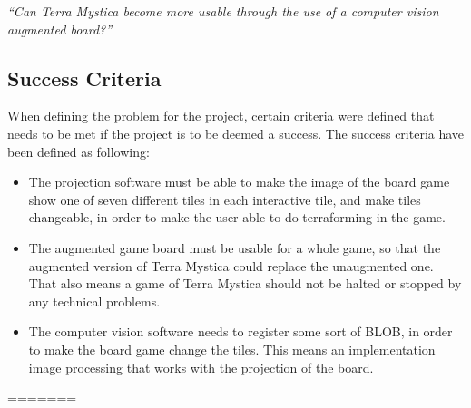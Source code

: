 \textit{“Can Terra Mystica become more usable through the use of a computer vision augmented board?”}

\subsection{Success Criteria}
When defining the problem for the project, certain criteria were defined that needs to be met if the project is to be deemed a success. The success criteria have been defined as following:

\begin{itemize}
	\item The projection software must be able to make the image of the board game show one of seven different tiles in each interactive tile, and make tiles changeable, in order to make the user able to do terraforming in the game.
	\item The augmented game board must be usable for a whole game, so that the augmented version of Terra Mystica could replace the unaugmented one. That also means a game of Terra Mystica should not be halted or stopped by any technical problems.
	\item The computer vision software needs to register some sort of BLOB, in order to make the board game change the tiles. This means an implementation image processing that works with the projection of the board.
\end{itemize} 
=======

